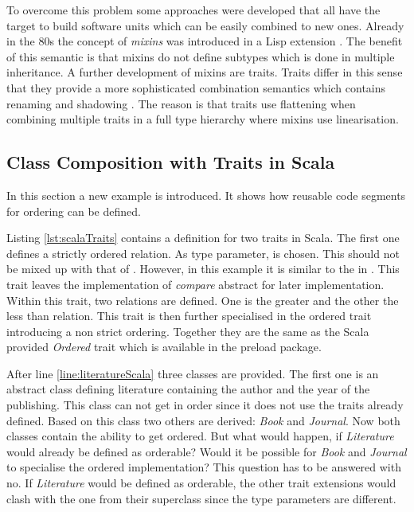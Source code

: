 To overcome this problem some approaches were developed that all
have the target to build software units which can be easily
combined to new ones. Already in the 80s the concept of
\emph{mixins} was introduced
in a Lisp extension \cite{moon_object-oriented_1986}. The benefit
of this semantic is that mixins do not define subtypes which is
done in multiple inheritance. A further development of mixins are
traits. Traits differ in this sense that they provide a more
sophisticated combination semantics which contains renaming and shadowing
\cite{schaerli_traits:_2003}. The reason is that traits use flattening
when combining multiple traits in a full type hierarchy where mixins
use linearisation.

\subsection{Class Composition with Traits in Scala}
In this section a new example is introduced. It shows how reusable code
segments for ordering can be defined.

Listing \ref{lst:scalaTraits} contains a definition for two traits in Scala. The
first one defines a strictly ordered relation. As type parameter, \mytype is
chosen. This should not be mixed up with that of \ooplss. However, 
in this example it is similar to the \mytype in \ooplss. This trait leaves
the implementation of \emph{compare} abstract for later implementation. Within this trait,
two relations are defined. One is the greater and the other the less than
relation. This trait is then further specialised in the ordered trait
introducing a non strict ordering. Together they are the same as the Scala
provided \emph{Ordered} trait which is available in the preload package.

After line \ref{line:literatureScala} three classes are provided. The
first one is an abstract class defining literature containing the author
and the year of the publishing. This class can not get in order since it does
not use the traits already defined. Based on this class two others are
derived: \emph{Book} and \emph{Journal}. Now both classes contain the
ability to get ordered. But what would happen, if \emph{Literature} would
already be defined as orderable? Would it be possible for \emph{Book}
and \emph{Journal} to specialise the ordered implementation? This question
has to be answered with no. If \emph{Literature} would be defined as
orderable, the other trait extensions would clash with the one from their
superclass since the type parameters are different.

